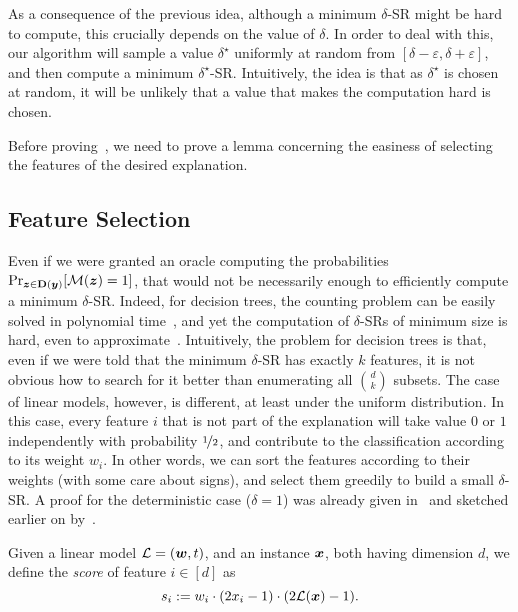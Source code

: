 As a consequence of the previous idea, although a minimum $\delta$-SR might be hard to compute, this crucially depends on the value of $\delta$. In order to deal with this, our algorithm will sample a value $\delta^\star$ uniformly at random from $[\delta-\varepsilon, \delta+\varepsilon]$, and then compute a minimum $\delta^\star$-SR. Intuitively, the idea is that as $\delta^\star$ is chosen at random, it will be unlikely that a value that makes the computation hard is chosen. 

Before proving~, we need to prove a lemma concerning the easiness of selecting the features of the desired explanation.

\subsection{Feature Selection}

Even if we were granted an oracle computing the probabilities
\(
    \Pr_{{\bm{z}}  \in \mathbf{D}({\bm{y}})}[\mathcal{M}({\bm{z}}) = 1]
\), that would not be necessarily enough to efficiently compute a minimum $\delta$-SR. Indeed, for decision trees, the counting problem can be easily solved in polynomial time~\citep{NEURIPS2020_b1adda14}, and yet the computation of $\delta$-SRs of minimum size is hard, even to approximate~\citep{NEURIPS2022_b8963f6a, Kozachinskiy_2023}.
Intuitively, the problem for decision trees is that, even if we were told that the minimum $\delta$-SR has exactly $k$ features, it is not obvious how to search for it better than enumerating all $\binom{d}{k}$ subsets. The case of linear models, however, is different, at least under the uniform distribution. In this case, every feature $i$ that is not part of the explanation will take value $0$ or $1$ independently with probability $\nicefrac{1}{2}$, and contribute to the classification according to its weight $w_i$. In other words, we can sort the features according to their weights (with some care about signs), and select them greedily to build a small $\delta$-SR. A proof for the deterministic case ($\delta = 1$) was already given in~\cite{NEURIPS2020_b1adda14} and sketched earlier on by~\cite{ExplainingNaiveBayes}.

\begin{definition}\label{def:scores}
    Given a linear model $\mathcal{L} = ({\bm{w}}, t)$, and an instance ${\bm{x}}$, both having dimension $d$, we define the \emph{score} of feature $i \in [d]$ as 
    \[
        s_i := w_i \cdot (2x_i - 1) \cdot (2\mathcal{L}({\bm{x}}) - 1).    
    \]
\end{definition}


